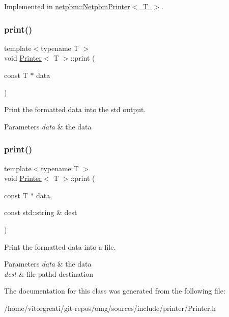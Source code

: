 Implemented in \mbox{\hyperlink{classnetpbm_1_1_netpbm_printer_a0bc962be71fd453792743af6cb676da2}{netpbm\+::\+Netpbm\+Printer$<$ T $>$}}.

\mbox{\label{class_printer_a93330573e6905facd02e08e7f18b4f8a}} 
\subsubsection{\texorpdfstring{print()}{print()}\hspace{0.1cm}{\footnotesize\ttfamily [1/2]}}
{\footnotesize\ttfamily template$<$typename T $>$ \\
void \mbox{\hyperlink{class_printer}{Printer}}$<$ T $>$\+::print (\begin{DoxyParamCaption}\item[{const T $\ast$}]{data }\end{DoxyParamCaption})\hspace{0.3cm}{\ttfamily [inline]}}



Print the formatted data into the std output. 


\begin{DoxyParams}{Parameters}
{\em data} & the data \\
\hline
\end{DoxyParams}
\mbox{\label{class_printer_af5d56046873ae78f533f240a3f55343d}} 
\subsubsection{\texorpdfstring{print()}{print()}\hspace{0.1cm}{\footnotesize\ttfamily [2/2]}}
{\footnotesize\ttfamily template$<$typename T $>$ \\
void \mbox{\hyperlink{class_printer}{Printer}}$<$ T $>$\+::print (\begin{DoxyParamCaption}\item[{const T $\ast$}]{data,  }\item[{const std\+::string \&}]{dest }\end{DoxyParamCaption})\hspace{0.3cm}{\ttfamily [inline]}}



Print the formatted data into a file. 


\begin{DoxyParams}{Parameters}
{\em data} & the data \\
\hline
{\em dest} & file pathd destination \\
\hline
\end{DoxyParams}


The documentation for this class was generated from the following file\+:\begin{DoxyCompactItemize}
\item 
/home/vitorgreati/git-\/repos/omg/sources/include/printer/Printer.\+h\end{DoxyCompactItemize}
